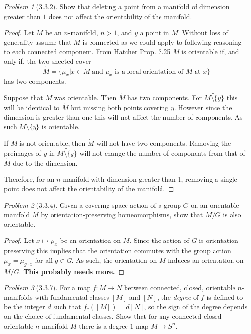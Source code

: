 \documentclass[10pt]{article}
\newcommand{\sk}{\vskip 10mm}
\newcommand{\wt}[1]{\widetilde{#1}}
\theoremstyle{remark}
\newtheorem{problem}{Problem}
\begin{document}
\begin{problem}[3.3.2]
  Show that deleting a point from a manifold of dimension greater than $1$
  does not affect the orientability of the manifold.
\end{problem}

\begin{proof}
  Let $M$ be an $n$-manifold, $n>1$, and $y$ a point in $M$. Without loss of
  generality assume that $M$ is connected as we could apply to following reasoning
  to each connected component. From Hatcher Prop. 3.25 $M$ is orientable if,
  and only if, the two-sheeted cover
  \[
    \wt{M}=\{\mu_x|\text{$x\in M$ and $\mu_x$ is a local orientation of $M$ at $x$}\}
  \]
  has two components.

  Suppose that $M$ was orientable. Then $\wt{M}$ has two components. For
  $\wt{M\setminus \{y\}}$ this will be identical to $\wt{M}$ but missing both points
  covering $y$. However since the dimension is greater than one this will
  not affect the number of components. As such $M\setminus\{y\}$ is orientable.

  If $M$ is not orientable, then $\wt{M}$ will not have two components.
  Removing the preimages of $y$ in $\wt{M\setminus\{y\}}$ will not change the number
  of components from that of $\wt{M}$ due to the dimension.

  Therefore, for an $n$-manifold with dimension greater than 1, removing a
  single point does not affect the orientability of the manifold.
\end{proof}

\sk

\begin{problem}[3.3.4]
  Given a covering space action of a group $G$ on an orientable manifold $M$
  by orientation-preserving homeomorphisms, show that $M/G$ is also orientable.
\end{problem}

\begin{proof}
  Let $x\mapsto \mu_x$ be an orientation on $M$. Since the action of $G$ is
  orientation preserving this implies that the orientation commutes with the
  group action $\mu_x=\mu_{g\cdot x}$ for all $g\in G$. As such, the orientation on
  $M$ induces an orientation on $M/G$. \textbf{This probably needs more.}
\end{proof}

\sk

\begin{problem}[3.3.7]
  For a map $f:M\rightarrow N$ between connected, closed, orientable $n$-manifolds
  with fundamental classes $[M]$ and $[N]$, the \textit{degree} of $f$ is
  defined to be the integer $d$ such that $f_*([M])=d[N]$, so the sign of the
  degree depends on the choice of fundamental classes. Show that for any
  connected closed orientable $n$-manifold $M$ there is a degree $1$ map
  $M\rightarrow S^n$.
\end{problem}
\end{document}
